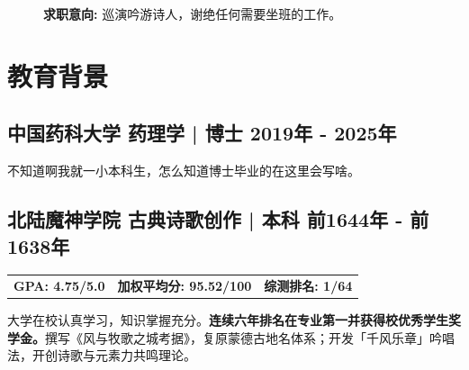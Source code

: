 \documentclass[11pt]{article}
\begin{document}
\begin{figure}[h]
\begin{minipage}[c]{0.12\textwidth}
        \end{minipage}
        \begin{minipage}[c]{0.99\textwidth}
            \textbf{求职意向: }\hspace{1em}巡演吟游诗人，谢绝任何需要坐班的工作。
        \end{minipage}
    \end{figure}
    \vspace{-1.6em}
    \section{\makebox[\widthof{\faGraduationCap}][c]{\color{CPU_Red}{\faGraduationCap}}\quad 教育背景}
            \subsection{ 中国药科大学 \qquad 药理学 | 博士 \hfill 2019年 - 2025年}
            \qquad 不知道啊我就一小本科生，怎么知道博士毕业的在这里会写啥。

            \subsection{ 北陆魔神学院 \qquad 古典诗歌创作 | 本科 \hfill 前1644年 - 前1638年}
            \vspace{-0.8em}
            \begin{tabularx}{\textwidth}{XXX}
                \textbf{GPA: 4.75/5.0 }& \textbf{加权平均分: 95.52/100}  & \textbf{综测排名: 1/64} 
            \end{tabularx}
            大学在校认真学习，知识掌握充分。\textbf{连续六年排名在专业第一并获得校优秀学生奖学金。}撰写《风与牧歌之城考据》，复原蒙德古地名体系；开发「千风乐章」吟唱法，开创诗歌与元素力共鸣理论。
\end{document}
